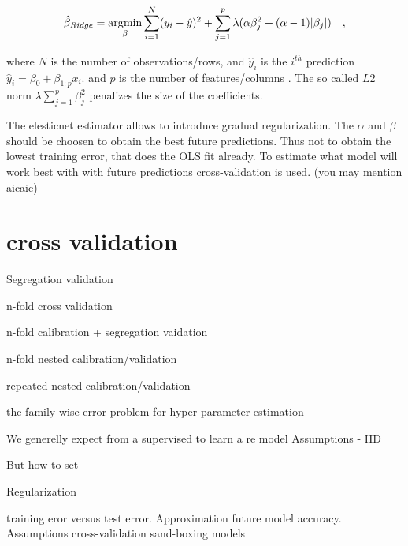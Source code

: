 \begin{equation}
\hat{\beta}_{Ridge}  = 	\underset{\beta}{\operatorname*{\arg\!\min}} 
\sum_{i=1}^{N} (y_i - \hat{y})^2 + 
\sum_{j=1}^{p} \lambda(
	 \alpha       \beta_j^2 + 
    (\alpha -1) | \beta_j |
) \quad ,
\end{equation}

where $N$ is the number of observations/rows, and $\hat{y}_i$ is the $i^{th}$ prediction $\hat{y}_i = \beta_0 + \beta_{1:p} x_i.$ and $p$ is the number of features/columns \cite{friedman2001elements}. The so called $L2$ norm $\lambda \sum_{j=1}^{p} \beta_j^2$ penalizes the size of the coefficients.

The elesticnet estimator allows to introduce gradual regularization. The $\alpha$ and $\beta$ should be choosen to obtain the best future predictions. Thus not to obtain the lowest training error, that does the OLS fit already. To estimate what model will work best with with future predictions cross-validation is used. (you may mention aicaic)

\section{cross validation}

Segregation validation

n-fold cross validation

n-fold calibration + segregation vaidation

n-fold nested calibration/validation

repeated nested calibration/validation

the family wise error problem for hyper parameter estimation

\cite{krstajic2014cross}

We generelly expect from a supervised to learn a re model 
Assumptions - IID



But how to set 

Regularization 

training eror versus test error. Approximation future model accuracy.
Assumptions cross-validation
sand-boxing models
\

